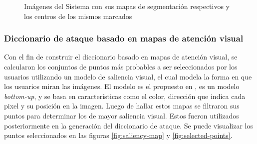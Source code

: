 \begin{figure}[H]
\begin{minipage}[b]{0.3\textwidth}
	\end{minipage}
	\caption{Imágenes del Sistema con sus mapas de segmentaci\'on respectivos y los centros de los mismos marcados}
	\label{fig:images-segments}
\end{figure}

\subsubsection{Diccionario de ataque basado en mapas de atenci\'on visual}
Con el fin de construir el diccionario basado en mapas de atención visual, se calcularon los conjuntos de  puntos m\'as probables a ser seleccionados por los usuarios utilizando un modelo de saliencia visual, el cual modela la forma en que los usuarios miran las im\'agenes. El modelo es el propuesto en \cite{itti2000saliency}, es un modelo \textit{bottom-up}, y se basa en caracter\'isticas como el color, direcci\'on que indica cada pixel y su posici\'on en la imagen. Luego de hallar estos mapas se filtraron sus puntos para determinar los de mayor saliencia visual. Estos fueron utilizados posteriormente en la generaci\'on del diccionario de ataque. Se puede visualizar los puntos seleccionados en las figuras \ref{fig:saliency-map} y \ref{fig:selected-points}.

